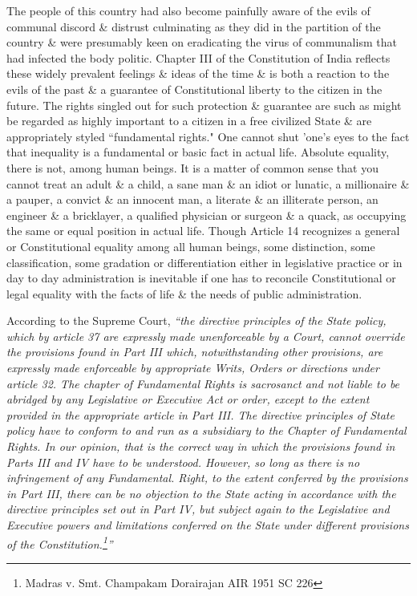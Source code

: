 \begin{multicols}{2}
\noi
The people of this country had also become painfully aware of the evils of communal discord \& distrust culminating as they did in the partition of the country \& were presumably keen on eradicating the virus of communalism that had infected the body politic. Chapter III of the Constitution of India reflects these widely prevalent feelings \& ideas of the time \& is both a reaction to the evils of the past \& a guarantee of Constitutional liberty to the citizen in the future. The rights singled out for such protection \& guarantee are such as might be regarded as highly important to a citizen in a free civilized State \& are appropriately styled “fundamental rights." One cannot shut 'one's eyes to the fact that inequality is a fundamental or basic fact in actual life. Absolute equality, there is not, among human beings. It is a matter of common sense that you cannot treat an adult \& a child, a sane man \& an idiot or lunatic, a millionaire \& a pauper, a convict \& an innocent man, a literate \& an illiterate person, an engineer \& a bricklayer, a qualified physician or surgeon \& a quack, as occupying the same or equal position in actual life. Though Article 14 recognizes a general or Constitutional equality among all human beings, some distinction, some classification, some gradation or differentiation either in legislative practice or in day to day administration is inevitable if one has to reconcile Constitutional or legal equality with the facts of life \& the needs of public administration.

\noi
According to the Supreme Court, \textit{“the directive principles of the State policy, which by article 37 are expressly made unenforceable by a Court, cannot override the provisions found in Part III which, notwithstanding other provisions, are expressly made enforceable by appropriate Writs, Orders or directions under article 32. The chapter of Fundamental Rights is sacrosanct and not liable to be abridged by any Legislative or Executive Act or order, except to the extent provided in the appropriate article in Part III. The directive principles of State policy have to conform to and run as a subsidiary to the Chapter of Fundamental Rights. In our opinion, that is the correct way in which the provisions found in Parts III and IV have to be understood. However, so long as there is no infringement of any Fundamental. Right, to the extent conferred by the provisions in Part III, there can be no objection to the State acting in accordance with the directive principles set out in Part IV, but subject again to the Legislative and Executive powers and limitations conferred on the State under different provisions of the Constitution.\footnote{Madras v. Smt. Champakam Dorairajan AIR 1951 SC 226}”}


\end{multicols}
